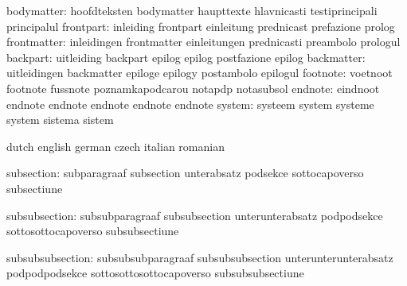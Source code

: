                bodymatter: hoofdteksten              bodymatter
                           haupttexte                hlavnicasti
                           testiprincipali           principalul %
                frontpart: inleiding                 frontpart
                           einleitung                prednicast
                           prefazione                prolog
              frontmatter: inleidingen               frontmatter
                           einleitungen              prednicasti
                           preambolo                 prologul
                 backpart: uitleiding                backpart
                           epilog                    epilog
                           postfazione               epilog %
               backmatter: uitleidingen              backmatter
                           epiloge                   epilogy
                           postambolo                epilogul %
                 footnote: voetnoot                  footnote
                           fussnote                  poznamkapodcarou
                           notapdp                   notasubsol
                  endnote: eindnoot                  endnote
                           endnote                   endnote
                           endnote                   endnote
                   system: systeem                   system
                           systeme                   system
                           sistema                   sistem

\stopvariables


\startvariables         dutch                                    english
                        german                                   czech
                        italian                                  romanian

            subsection: subparagraaf                             subsection
                        unterabsatz                              podsekce
                        sottocapoverso                           subsectiune

         subsubsection: subsubparagraaf                          subsubsection
                        unterunterabsatz                         podpodsekce
                        sottosottocapoverso                      subsubsectiune

      subsubsubsection: subsubsubparagraaf                       subsubsubsection
                        unterunterunterabsatz                    podpodpodsekce
                        sottosottosottocapoverso                 subsubsubsectiune

